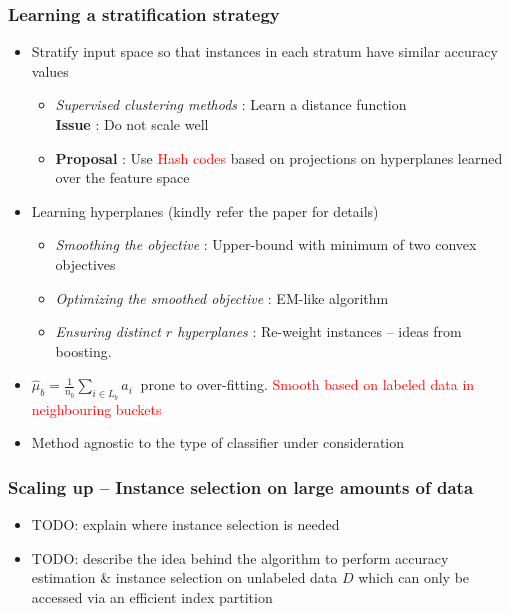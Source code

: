 \documentclass[11pt]{beamer}
\newcommand{\acc}{{a}}
\newcommand{\estSb}{{\mbox{$\hat{\mu}$}}}
\newlength{\wideitemsep}
\let\olditem\item
\renewcommand{\item}{\setlength{\itemsep}{\wideitemsep}\olditem}
\begin{document}
\begin{frame}
\frametitle{Learning a stratification strategy} %
\begin{itemize}
\item Stratify input space so that instances in each stratum have similar accuracy values
\begin{itemize}
\item \emph{Supervised clustering methods} : Learn a distance function \\ \textbf{Issue} : Do not scale well 
\item \textbf{Proposal} : Use \textcolor{red}{Hash codes} based on projections on hyperplanes learned over the feature space
\end{itemize}
\item Learning hyperplanes (kindly refer the paper for details)
\begin{itemize}
\item \emph{Smoothing the objective} : Upper-bound with minimum of two convex objectives
\item \emph{Optimizing the smoothed objective} : EM-like algorithm
\item \emph{Ensuring distinct $r$ hyperplanes} : Re-weight instances -- ideas from boosting. 
\end{itemize}
\item $\estSb_b=\frac{1}{n_b}\sum_{i\in L_b}\acc_i~$ prone to over-fitting. \textcolor{red}{Smooth based on labeled data in neighbouring buckets}
\item Method agnostic to the type of classifier under consideration
\end{itemize}
\end{frame}

\begin{frame}
\frametitle{Scaling up -- Instance selection on large amounts of data} 
\begin{itemize}
\item TODO: explain where instance selection is needed
\item TODO: describe the idea behind the algorithm to perform accuracy estimation \& instance selection on unlabeled data $D$ which can only be accessed via an efficient index partition 
\end{itemize}
\end{frame}

\end{document}
